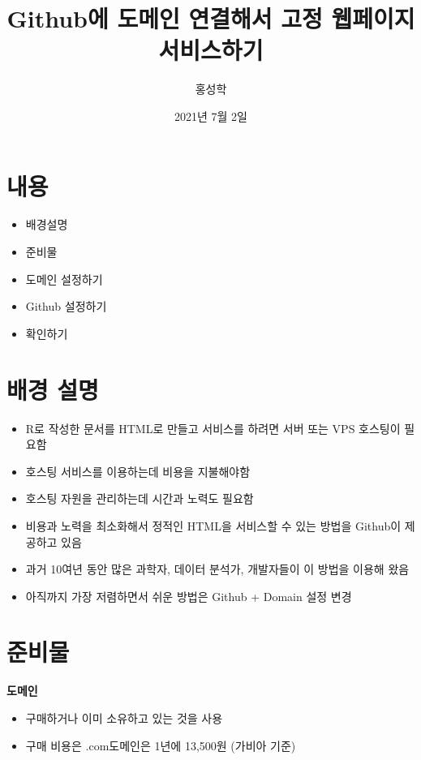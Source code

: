 \documentclass[
]{article}
\title{Github에 도메인 연결해서 고정 웹페이지 서비스하기}
\author{홍성학}
\date{2021년 7월 2일}
\providecommand{\tightlist}{%
  \setlength{\itemsep}{0pt}\setlength{\parskip}{0pt}}
\begin{document}
\maketitle

\hypertarget{uxb0b4uxc6a9}{%
\section{내용}\label{uxb0b4uxc6a9}}

\begin{itemize}
\tightlist
\item
  배경설명
\item
  준비물
\item
  도메인 설정하기
\item
  Github 설정하기
\item
  확인하기
\end{itemize}

\hypertarget{uxbc30uxacbd-uxc124uxba85}{%
\section{배경 설명}\label{uxbc30uxacbd-uxc124uxba85}}

\begin{itemize}
\tightlist
\item
  R로 작성한 문서를 HTML로 만들고 서비스를 하려면 서버 또는 VPS 호스팅이
  필요함
\item
  호스팅 서비스를 이용하는데 비용을 지불해야함
\item
  호스팅 자원을 관리하는데 시간과 노력도 필요함
\item
  비용과 노력을 최소화해서 정적인 HTML을 서비스할 수 있는 방법을
  Github이 제공하고 있음
\item
  과거 10여년 동안 많은 과학자, 데이터 분석가, 개발자들이 이 방법을
  이용해 왔음
\item
  아직까지 가장 저렴하면서 쉬운 방법은 Github + Domain 설정 변경
\end{itemize}

\hypertarget{uxc900uxbe44uxbb3c}{%
\section{준비물}\label{uxc900uxbe44uxbb3c}}

\textbf{도메인}

\begin{itemize}
\tightlist
\item
  구매하거나 이미 소유하고 있는 것을 사용
\item
  구매 비용은 .com도메인은 1년에 13,500원 (가비아 기준)
\end{itemize}
\end{document}
